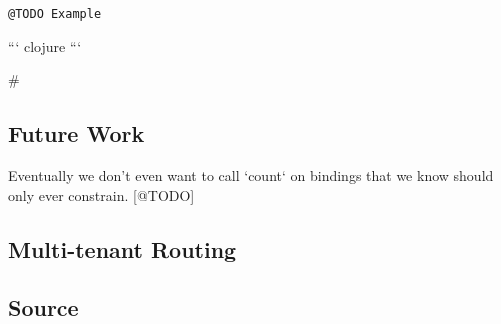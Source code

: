 \documentclass[../index.tex]{subfiles}
\begin{document}
\texttt{@TODO Example}

``` clojure
```

\#\subsection{Future Work}

Eventually we don't even want to call `count` on bindings that we know
should only ever constrain. [@TODO]

\subsection{Multi-tenant Routing}



\subsection{Source}
\end{document}
